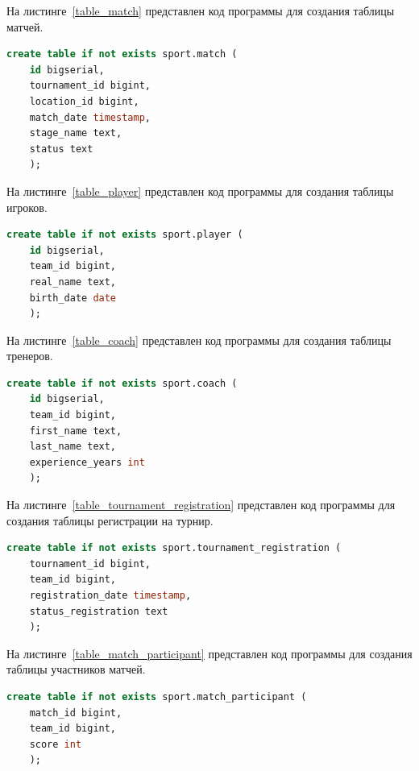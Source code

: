 На листинге~\ref{table_match} представлен код программы для создания таблицы матчей.

\begin{lstlisting}[language=SQL, caption=\raggedright{Создание таблицы матчей}, label=table_match]
	create table if not exists sport.match (
	id bigserial,
	tournament_id bigint,
	location_id bigint,
	match_date timestamp,
	stage_name text,
	status text
	);
\end{lstlisting}

На листинге~\ref{table_player} представлен код программы для создания таблицы игроков.

\begin{lstlisting}[language=SQL, caption=\raggedright{Создание таблицы игроков}, label=table_player]
	create table if not exists sport.player (
	id bigserial,
	team_id bigint,
	real_name text,
	birth_date date
	);
\end{lstlisting}

На листинге~\ref{table_coach} представлен код программы для создания таблицы тренеров.

\begin{lstlisting}[language=SQL, caption=\raggedright{Создание таблицы тренеров}, label=table_coach]
	create table if not exists sport.coach (
	id bigserial,
	team_id bigint,
	first_name text,
	last_name text,
	experience_years int
	);
\end{lstlisting}

На листинге~\ref{table_tournament_registration} представлен код программы для создания таблицы регистрации на турнир.

\begin{lstlisting}[language=SQL, caption=\raggedright{Создание таблицы регистрации на турнир}, label=table_tournament_registration]
	create table if not exists sport.tournament_registration (
	tournament_id bigint,
	team_id bigint,
	registration_date timestamp,
	status_registration text
	);
\end{lstlisting}

На листинге~\ref{table_match_participant} представлен код программы для создания таблицы участников матчей.

\begin{lstlisting}[language=SQL, caption=\raggedright{Создание таблицы участников матчей}, label=table_match_participant]
	create table if not exists sport.match_participant (
	match_id bigint,
	team_id bigint,
	score int
	);
\end{lstlisting}

